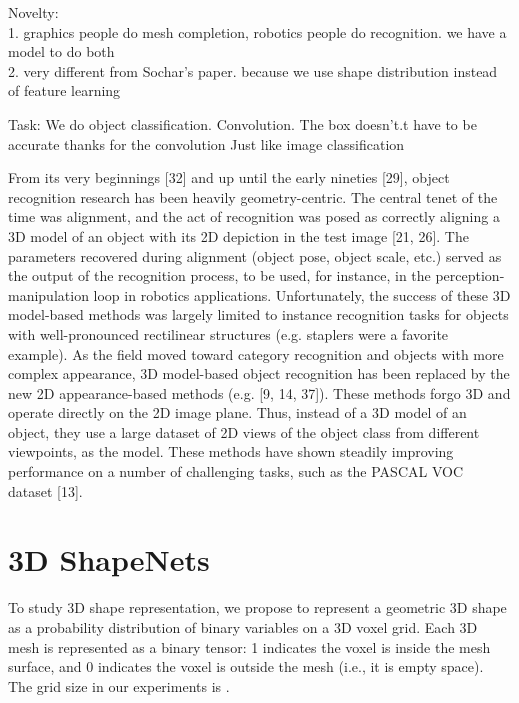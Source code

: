 \documentclass[10pt,twocolumn,letterpaper]{article}
\begin{document}
Novelty:\\
1. graphics people do mesh completion, robotics people do recognition. we have a model to do both\\
2. very different from Sochar’s paper. because we use shape distribution instead of feature learning

Task:
We do object classification.
Convolution. The box doesn't.t have to be accurate thanks for the convolution
Just like image classification

From its very beginnings [32] and up until the early
nineties [29], object recognition research has been heavily
geometry-centric. The central tenet of the time was alignment,
and the act of recognition was posed as correctly
aligning a 3D model of an object with its 2D depiction in
the test image [21, 26]. The parameters recovered during
alignment (object pose, object scale, etc.) served as the output
of the recognition process, to be used, for instance, in
the perception-manipulation loop in robotics applications.
Unfortunately, the success of these 3D model-based methods
was largely limited to instance recognition tasks for
objects with well-pronounced rectilinear structures (e.g. staplers were a favorite example). As the field moved toward
category recognition and objects with more complex appearance,
3D model-based object recognition has been replaced
by the new 2D appearance-based methods (e.g. [9, 14, 37]).
These methods forgo 3D and operate directly on the 2D image
plane. Thus, instead of a 3D model of an object, they
use a large dataset of 2D views of the object class from different
viewpoints, as the model. These methods have shown
steadily improving performance on a number of challenging
tasks, such as the PASCAL VOC dataset [13].

\fi




\section{3D ShapeNets} 

To study 3D shape representation,
we propose to represent a geometric 3D shape as a probability distribution of binary variables on a 3D voxel grid.
Each 3D mesh is represented as a binary tensor: 1 indicates the voxel is inside the mesh surface, and 0 indicates the voxel is outside the mesh (i.e., it is empty space).
The grid size in our experiments is . 
\end{document}
